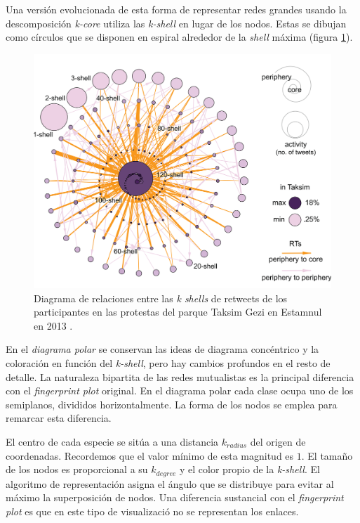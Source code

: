 Una versión evolucionada de esta forma de representar redes grandes usando la descomposición \textit{k-core} utiliza las \textit{k-shell} en lugar de los nodos. Estas se dibujan como círculos que se disponen en espiral alrededor de la \textit{shell} máxima (figura \ref{fig:VIS_taksim}).

\begin{figure}[h!]
\centering
\includegraphics[scale=0.6]{Figures/VIS_taksim.png}
\caption{Diagrama de relaciones entre las \textit{k shells} de retweets de los participantes en las protestas del parque Taksim Gezi en Estamnul en 2013   \cite{barbera2015critical}.}
\label{fig:VIS_taksim}
\end{figure}


En el \textit{diagrama polar} se conservan las ideas de diagrama concéntrico y la coloración en función del \textit{k-shell}, pero hay cambios profundos en el resto de detalle. La naturaleza bipartita de las redes mutualistas es la principal diferencia con el \textit{fingerprint plot} original. En el diagrama polar cada clase ocupa uno de los semiplanos, divididos horizontalmente. La forma de los nodos se emplea para remarcar esta diferencia. 

El centro de cada especie se sitúa a una distancia $k_{radius}$ del origen de coordenadas. Recordemos que el valor mínimo de esta magnitud es $1$. El tamaño de los nodos es proporcional a su $k_{degree}$ y el color propio de la \textit{k-shell}. El algoritmo de representación asigna el ángulo que se distribuye para evitar al máximo la superposición de nodos. Una diferencia sustancial con el  \textit{fingerprint plot} es que en este tipo de visualizació no se representan los enlaces.

